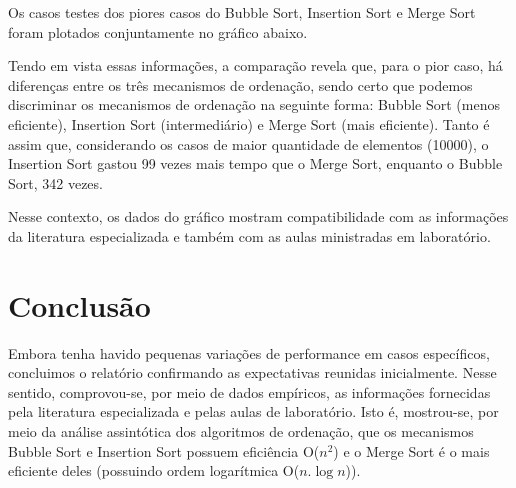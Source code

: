 \documentclass[a4paper, 12pt]{article}
\begin{document}
\tab{ }Os casos testes dos piores casos do Bubble Sort, Insertion Sort e Merge Sort foram plotados conjuntamente no gráfico abaixo.
\begin{center}
\end{center}


\vspace{0.8cm}
Tendo em vista essas informações, a comparação revela que, para o pior caso, há diferenças entre os três mecanismos de ordenação, sendo certo que podemos discriminar os mecanismos de ordenação na seguinte forma: Bubble Sort (menos eficiente), Insertion Sort (intermediário) e Merge Sort (mais eficiente). Tanto é assim que, considerando os casos de maior quantidade de elementos (10000), o Insertion Sort gastou 99 vezes mais tempo que o Merge Sort, enquanto o Bubble Sort, 342 vezes.

Nesse contexto, os dados do gráfico mostram compatibilidade com as informações da literatura especializada e também com as aulas ministradas em laboratório.


\section{Conclusão}

\tab{ }Embora tenha havido pequenas variações de performance em casos específicos, concluimos o relatório confirmando as expectativas reunidas inicialmente. Nesse sentido, comprovou-se, por meio de dados empíricos, as informações fornecidas pela literatura especializada e pelas aulas de laboratório. Isto é, mostrou-se, por meio da análise assintótica dos algoritmos de ordenação, que os mecanismos Bubble Sort e Insertion Sort possuem eficiência O($n^2$) e o Merge Sort é o mais eficiente deles (possuindo ordem logarítmica O($n.\log n$)).
\end{document}

